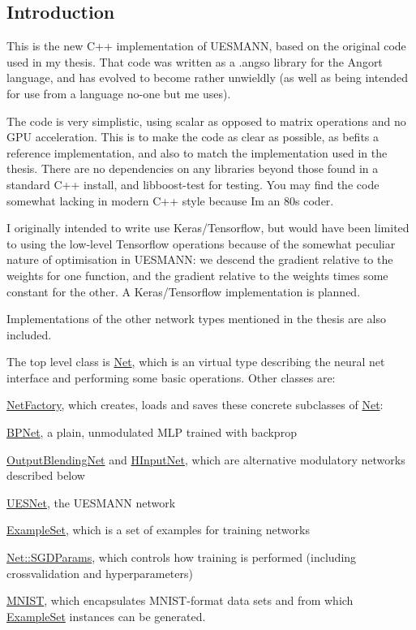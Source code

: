 \subsection*{Introduction}

This is the new C++ implementation of U\+E\+S\+M\+A\+NN, based on the original code used in my thesis. That code was written as a {\ttfamily .angso} library for the Angort language, and has evolved to become rather unwieldly (as well as being intended for use from a language no-\/one but me uses).

The code is very simplistic, using scalar as opposed to matrix operations and no G\+PU acceleration. This is to make the code as clear as possible, as befits a reference implementation, and also to match the implementation used in the thesis. There are no dependencies on any libraries beyond those found in a standard C++ install, and libboost-\/test for testing. You may find the code somewhat lacking in modern C++ style because I\textquotesingle{}m an 80\textquotesingle{}s coder.

I originally intended to write use Keras/\+Tensorflow, but would have been limited to using the low-\/level Tensorflow operations because of the somewhat peculiar nature of optimisation in U\+E\+S\+M\+A\+NN\+: we descend the gradient relative to the weights for one function, and the gradient relative to the weights times some constant for the other. A Keras/\+Tensorflow implementation is planned.

Implementations of the other network types mentioned in the thesis are also included.

The top level class is \hyperlink{classNet}{Net}, which is an virtual type describing the neural net interface and performing some basic operations. Other classes are\+:


\begin{DoxyItemize}
\item \hyperlink{classNetFactory}{Net\+Factory}, which creates, loads and saves these concrete subclasses of \hyperlink{classNet}{Net}\+:
\begin{DoxyItemize}
\item \hyperlink{classBPNet}{B\+P\+Net}, a plain, unmodulated M\+LP trained with backprop
\item \hyperlink{classOutputBlendingNet}{Output\+Blending\+Net} and \hyperlink{classHInputNet}{H\+Input\+Net}, which are alternative modulatory networks described below
\item \hyperlink{classUESNet}{U\+E\+S\+Net}, the U\+E\+S\+M\+A\+NN network
\end{DoxyItemize}
\item \hyperlink{classExampleSet}{Example\+Set}, which is a set of examples for training networks
\item \hyperlink{structNet_1_1SGDParams}{Net\+::\+S\+G\+D\+Params}, which controls how training is performed (including crossvalidation and hyperparameters)
\item \hyperlink{classMNIST}{M\+N\+I\+ST}, which encapsulates M\+N\+I\+S\+T-\/format data sets and from which \hyperlink{classExampleSet}{Example\+Set} instances can be generated.
\end{DoxyItemize}

